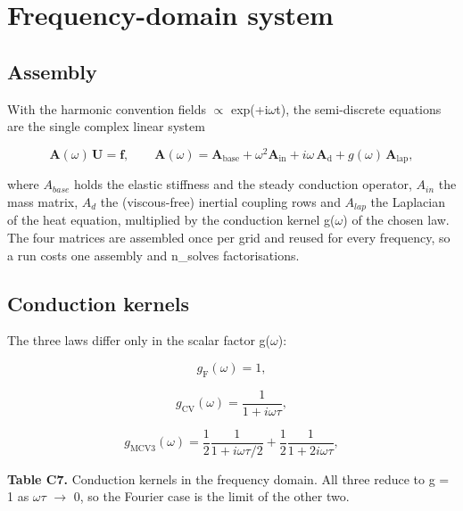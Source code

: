 \documentclass[preprint,12pt]{elsarticle}
\begin{document}
\section{Frequency-domain system}
\label{sec:7}

\subsection{Assembly}
\label{sec:7.1}

With the harmonic convention fields $\propto$ exp(+i$\omega$t), the semi-discrete equations are the single complex linear system

\begin{equation}
\mathbf{A}(\omega)\,\mathbf{U}=\mathbf{f},\qquad\mathbf{A}(\omega)=\mathbf{A}_{\mathrm{base}}+\omega^2\mathbf{A}_{\mathrm{in}}+i\omega\,\mathbf{A}_{\mathrm{d}}+g(\omega)\,\mathbf{A}_{\mathrm{lap}}, 
\label{eq:18}
\end{equation}

where $A_{base}$ holds the elastic stiffness and the steady conduction operator, $A_{in}$ the mass matrix, $A_{d}$ the (viscous-free) inertial coupling rows and $A_{lap}$ the Laplacian of the heat equation, multiplied by the conduction kernel g($\omega$) of the chosen law. The four matrices are assembled once per grid and reused for every frequency, so a run costs one assembly and n\_solves factorisations.

\subsection{Conduction kernels}
\label{sec:7.2}

The three laws differ only in the scalar factor g($\omega$):

\begin{equation}
g_{\mathrm{F}}(\omega)=1, 
\label{eq:19}
\end{equation}

\begin{equation}
g_{\mathrm{CV}}(\omega)=\frac{1}{1+i\omega\tau}, 
\label{eq:20}
\end{equation}

\begin{equation}
g_{\mathrm{MCV3}}(\omega)=\frac{1}{2}\frac{1}{1+i\omega\tau/2}+\frac{1}{2}\frac{1}{1+2i\omega\tau}, 
\label{eq:21}
\end{equation}

\textbf{Table C7.} Conduction kernels in the frequency domain. All three reduce to g = 1 as $\omega \tau$ $\to$ 0, so the Fourier case is the limit of the other two.
\end{document}
